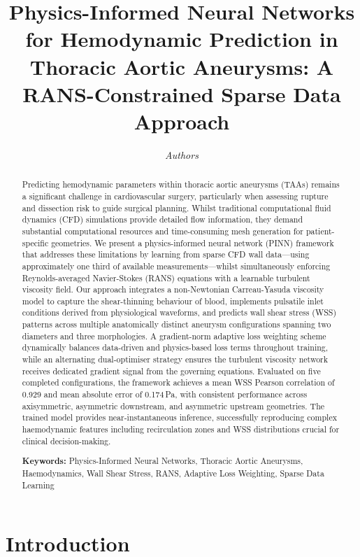 \documentclass[11pt,a4paper]{article}
\title{\textbf{Physics-Informed Neural Networks for Hemodynamic Prediction in Thoracic Aortic Aneurysms: A RANS-Constrained Sparse Data Approach}}
\author{
    \textit{Authors}
}
\date{}
\begin{document}
\maketitle

\begin{abstract}
Predicting hemodynamic parameters within thoracic aortic aneurysms (TAAs) remains a significant challenge in cardiovascular surgery, particularly when assessing rupture and dissection risk to guide surgical planning. Whilst traditional computational fluid dynamics (CFD) simulations provide detailed flow information, they demand substantial computational resources and time-consuming mesh generation for patient-specific geometries. We present a physics-informed neural network (PINN) framework that addresses these limitations by learning from sparse CFD wall data---using approximately one third of available measurements---whilst simultaneously enforcing Reynolds-averaged Navier-Stokes (RANS) equations with a learnable turbulent viscosity field. Our approach integrates a non-Newtonian Carreau-Yasuda viscosity model to capture the shear-thinning behaviour of blood, implements pulsatile inlet conditions derived from physiological waveforms, and predicts wall shear stress (WSS) patterns across multiple anatomically distinct aneurysm configurations spanning two diameters and three morphologies. A gradient-norm adaptive loss weighting scheme dynamically balances data-driven and physics-based loss terms throughout training, while an alternating dual-optimiser strategy ensures the turbulent viscosity network receives dedicated gradient signal from the governing equations. Evaluated on five completed configurations, the framework achieves a mean WSS Pearson correlation of 0.929 and mean absolute error of 0.174\,Pa, with consistent performance across axisymmetric, asymmetric downstream, and asymmetric upstream geometries. The trained model provides near-instantaneous inference, successfully reproducing complex haemodynamic features including recirculation zones and WSS distributions crucial for clinical decision-making.

\noindent \textbf{Keywords:} Physics-Informed Neural Networks, Thoracic Aortic Aneurysms, Haemodynamics, Wall Shear Stress, RANS, Adaptive Loss Weighting, Sparse Data Learning
\end{abstract}

\section{Introduction}
\end{document}
